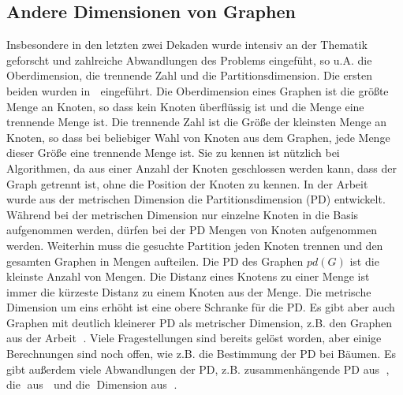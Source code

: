 \subsection{Andere Dimensionen von Graphen}
\vspace{-2mm}
Insbesondere in den letzten zwei Dekaden wurde intensiv an der Thematik geforscht und zahlreiche Abwandlungen des Problems eingefüht, so u.A. die Oberdimension, die trennende Zahl und die Partitionsdimension.\newline
Die ersten beiden wurden in \grqq$\;$\cite{upper} eingeführt. Die Oberdimension eines Graphen ist die größte Menge an Knoten, so dass kein Knoten überflüssig ist und die Menge eine trennende Menge ist. Die trennende Zahl ist die Größe der kleinsten Menge an Knoten, so dass bei beliebiger Wahl von Knoten aus dem Graphen, jede Menge dieser Größe eine trennende Menge ist. Sie zu kennen ist nützlich bei Algorithmen, da aus einer Anzahl der Knoten geschlossen werden kann, dass der Graph getrennt ist, ohne die Position der Knoten zu kennen.
\vspace{-1.5mm}\newline\newline 
In der Arbeit \grqq$\;$\cite{partit} wurde aus der metrischen Dimension die Partitionsdimension (PD) entwickelt. Während bei der metrischen Dimension nur einzelne Knoten in die Basis aufgenommen werden, dürfen bei der PD Mengen von Knoten aufgenommen werden. Weiterhin muss die gesuchte Partition jeden Knoten trennen und den gesamten Graphen in Mengen aufteilen. Die PD des Graphen $pd(G)$ ist die kleinste Anzahl von Mengen. Die Distanz eines Knotens zu einer Menge ist immer die kürzeste Distanz zu einem Knoten aus der Menge.\newline
Die metrische Dimension um eins erhöht ist eine obere Schranke für die PD\cite{partit}. Es gibt aber auch Graphen mit deutlich kleinerer PD als metrischer Dimension, z.B. den Graphen aus der Arbeit \grqq$\;$\cite{disc}. Viele Fragestellungen sind bereits gelöst worden, aber einige Berechnungen sind noch offen, wie z.B. die Bestimmung der PD bei Bäumen. Es gibt außerdem viele Abwandlungen der PD, z.B. zusammenhängende PD aus \grqq$\;$\cite{con}, die \grqq$\;$aus \grqq$\;$\cite{loc} und die \grqq$\;$Dimension aus \grqq$\;$\cite{forcing}.
\vspace{-4mm}
